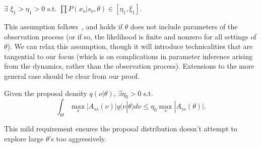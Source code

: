 \begin{assumption}
$\exists$ $ \xi_1 > \eta_1 > 0$ s.t. 
$\prod P(x_o | s_o, \theta) \in [\eta_1, \xi_1]$.
  \label{asmp:obs_bnd}
\end{assumption}
\noindent This assumption follows~\cite{miasojedow2017}, and holds if 
$\theta$ does not include parameters of the observation process (or if so,
the likelihood is finite and nonzero for all settings of $\theta$). We can relax this assumption,
though it will introduce technicalities that are tangential to our focus
(which is on complications in parameter inference arising from the 
dynamics, rather than the observation process). Extensions to the more 
general case should be clear from our proof.

\begin{assumption}
Given the proposal density $q(\nu | \theta)$, $\exists \eta_0 > 0$ s.t. $$ \int_\Theta \max_s|A_{ss}(\nu)| q(\nu | \theta)d\nu \leq \eta_0 \max_s|A_{ss}(\theta)|.$$
\end{assumption}
\noindent This mild requirement ensures the proposal distribution doesn't attempt
to explore large $\theta$'s too aggressively.





